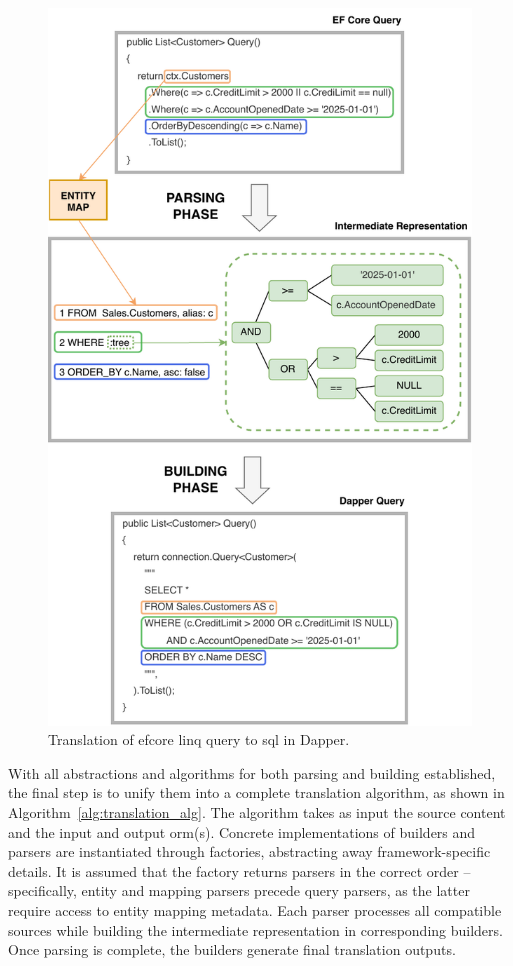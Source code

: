 \begin{figure}[!p]
  \centering
  \includegraphics[scale=1]{thesis/img/thesis/04_parsing_building_queries.drawio.pdf}
  \caption{Translation of \acrshort{efcore} \acrshort{linq} query to \acrshort{sql} in Dapper.}
  \label{fig:translation_complete_query}
\end{figure}

With all abstractions and algorithms for both parsing and building established, the final step is to unify them into a complete translation algorithm, as shown in Algorithm~\ref{alg:translation_alg}. The algorithm takes as input the source content and the input and output \acrshort{orm}(s). Concrete implementations of builders and parsers are instantiated through factories, abstracting away framework-specific details. It is assumed that the factory returns parsers in the correct order -- specifically, entity and mapping parsers precede query parsers, as the latter require access to entity mapping metadata. Each parser processes all compatible sources while building the intermediate representation in corresponding builders. Once parsing is complete, the builders generate final translation outputs.

